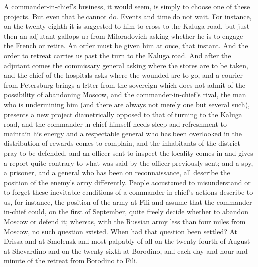 A commander-in-chief's business, it would seem, is simply to
choose one of these projects. But even that he cannot do. Events
and time do not wait. For instance, on the twenty-eighth it is
suggested to him to cross to the Kaluga road, but just then an
adjutant gallops up from Miloradovich asking whether he is to
engage the French or retire. An order must be given him at once,
that instant. And the order to retreat carries us past the turn
to the Kaluga road. And after the adjutant comes the commissary
general asking where the stores are to be taken, and the chief of
the hospitals asks where the wounded are to go, and a courier
from Petersburg brings a letter from the sovereign which does not
admit of the possibility of abandoning Moscow, and the
commander-in-chief's rival, the man who is undermining him (and
there are always not merely one but several such), presents a new
project diametrically opposed to that of turning to the Kaluga
road, and the commander-in-chief himself needs sleep and
refreshment to maintain his energy and a respectable general who
has been overlooked in the distribution of rewards comes to
complain, and the inhabitants of the district pray to be
defended, and an officer sent to inspect the locality comes in
and gives a report quite contrary to what was said by the officer
previously sent; and a spy, a prisoner, and a general who has
been on reconnaissance, all describe the position of the enemy's
army differently. People accustomed to misunderstand or to forget
these inevitable conditions of a commander-in-chief's actions
describe to us, for instance, the position of the army at Fili
and assume that the commander-in-chief could, on the first of
September, quite freely decide whether to abandon Moscow or
defend it; whereas, with the Russian army less than four miles
from Moscow, no such question existed. When had that question
been settled? At Drissa and at Smolensk and most palpably of all
on the twenty-fourth of August at Shevardino and on the
twenty-sixth at Borodino, and each day and hour and minute of the
retreat from Borodino to Fili.


